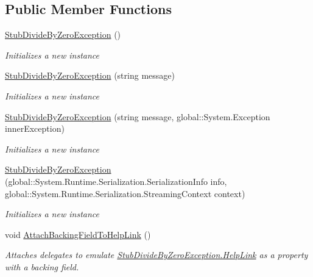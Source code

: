 \subsection*{Public Member Functions}
\begin{DoxyCompactItemize}
\item 
\hyperlink{class_system_1_1_fakes_1_1_stub_divide_by_zero_exception_a60c4b0eb4c5f2d14f573fc7290cfdbc7}{Stub\-Divide\-By\-Zero\-Exception} ()
\begin{DoxyCompactList}\small\item\em Initializes a new instance\end{DoxyCompactList}\item 
\hyperlink{class_system_1_1_fakes_1_1_stub_divide_by_zero_exception_a6f1c732f8ae7c26f15d4c011bdf689c6}{Stub\-Divide\-By\-Zero\-Exception} (string message)
\begin{DoxyCompactList}\small\item\em Initializes a new instance\end{DoxyCompactList}\item 
\hyperlink{class_system_1_1_fakes_1_1_stub_divide_by_zero_exception_acfebb0ff0e09e7a02d25156c43b3a775}{Stub\-Divide\-By\-Zero\-Exception} (string message, global\-::\-System.\-Exception inner\-Exception)
\begin{DoxyCompactList}\small\item\em Initializes a new instance\end{DoxyCompactList}\item 
\hyperlink{class_system_1_1_fakes_1_1_stub_divide_by_zero_exception_a5d794047cc157c951b3149e65b9b84e2}{Stub\-Divide\-By\-Zero\-Exception} (global\-::\-System.\-Runtime.\-Serialization.\-Serialization\-Info info, global\-::\-System.\-Runtime.\-Serialization.\-Streaming\-Context context)
\begin{DoxyCompactList}\small\item\em Initializes a new instance\end{DoxyCompactList}\item 
void \hyperlink{class_system_1_1_fakes_1_1_stub_divide_by_zero_exception_abd77e5b8f31ed305f1012de91a154f68}{Attach\-Backing\-Field\-To\-Help\-Link} ()
\begin{DoxyCompactList}\small\item\em Attaches delegates to emulate \hyperlink{class_system_1_1_fakes_1_1_stub_divide_by_zero_exception_a8492480a2e447faf70f6635bf0b726dc}{Stub\-Divide\-By\-Zero\-Exception.\-Help\-Link} as a property with a backing field.\end{DoxyCompactList}\item 

\end{DoxyCompactItemize}

